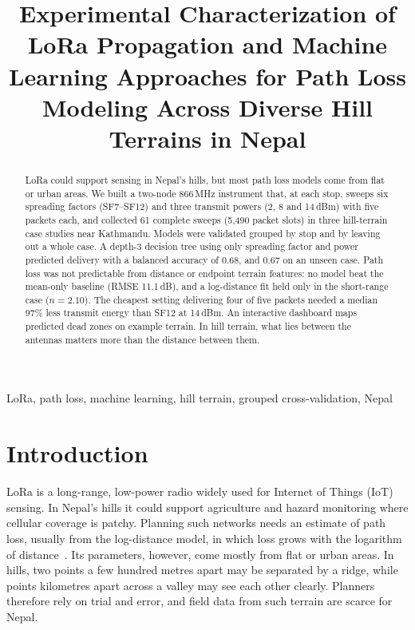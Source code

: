 \documentclass[conference]{IEEEtran}
\newcommand{\dBm}{\,dBm\xspace}
\newcommand{\dB}{\,dB\xspace}
\begin{document}
\title{Experimental Characterization of LoRa Propagation and Machine Learning Approaches for Path Loss Modeling Across Diverse Hill Terrains in Nepal}

\author{
}

\maketitle

\begin{abstract}
LoRa could support sensing in Nepal's hills, but most path loss models come from flat or urban areas. We built a two-node 866\,MHz instrument that, at each stop, sweeps six spreading factors (SF7--SF12) and three transmit powers (2, 8 and 14\dBm) with five packets each, and collected 61 complete sweeps (5,490 packet slots) in three hill-terrain case studies near Kathmandu. Models were validated grouped by stop and by leaving out a whole case. A depth-3 decision tree using only spreading factor and power predicted delivery with a balanced accuracy of 0.68, and 0.67 on an unseen case. Path loss was not predictable from distance or endpoint terrain features: no model beat the mean-only baseline (RMSE 11.1\dB), and a log-distance fit held only in the short-range case ($n = 2.10$). The cheapest setting delivering four of five packets needed a median 97\% less transmit energy than SF12 at 14\dBm. An interactive dashboard maps predicted dead zones on example terrain. In hill terrain, what lies between the antennas matters more than the distance between them.
\end{abstract}

\begin{IEEEkeywords}
LoRa, path loss, machine learning, hill terrain, grouped cross-validation, Nepal
\end{IEEEkeywords}

\section{Introduction}

LoRa is a long-range, low-power radio widely used for Internet of Things (IoT) sensing. In Nepal's hills it could support agriculture and hazard monitoring where cellular coverage is patchy. Planning such networks needs an estimate of path loss, usually from the log-distance model, in which loss grows with the logarithm of distance~\cite{rappaport2002}. Its parameters, however, come mostly from flat or urban areas. In hills, two points a few hundred metres apart may be separated by a ridge, while points kilometres apart across a valley may see each other clearly. Planners therefore rely on trial and error, and field data from such terrain are scarce for Nepal.
\end{document}
